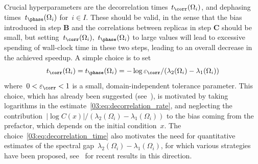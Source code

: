     Crucial hyperparameters are the decorrelation times~$t_{\corr}(\Omega_i)$, and dephasing times~$t_{\phase}(\Omega_i)$ for~$i\in I$. These should be valid, in the sense that the bias introduced in step {\bf B} and the correlations between replicas in step {\bf C} should be small, but setting~$t_{\corr}(\Omega_i),~t_{\phase}(\Omega_i)$ to large values will lead to excessive spending of wall-clock time in these two steps, leading to an overall decrease in the achieved speedup.
    A simple choice is to set
    \begin{equation}
        \label{03:eq:decorrelation_time}
        t_{\corr}(\Omega_i)=t_{\phase}(\Omega_i) = -\log\varepsilon_{\corr}/(\lambda_2(\Omega_i)-\lambda_1(\Omega_i))
    \end{equation} where~$0<\varepsilon_{\corr}<1$ is a small, domain-independent tolerance parameter.
    This choice, which has already been suggested (see~\cite{SL13,PUV15}), is motivated by taking logarithms in the estimate~\eqref{03:eq:decorrelation_rate}, and neglecting the contribution~$|\log C(x)|/(\lambda_2(\Omega_i)-\lambda_1(\Omega_i))$ to the bias coming from the prefactor, which depends on the initial condition~$x$.
    The choice~\eqref{03:eq:decorrelation_time} also motivates the need for quantitative estimates of the spectral gap~$\lambda_2(\Omega_i)-\lambda_1(\Omega_i)$, for which various strategies have been proposed, see~\cite[Section 3.3]{BLS25a} for recent results in this direction.

